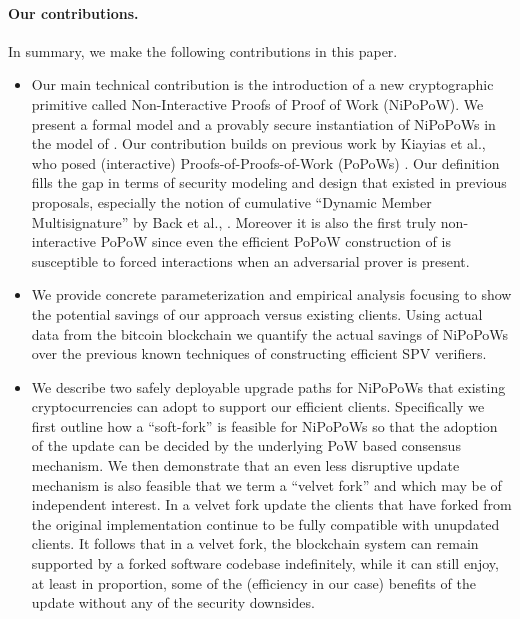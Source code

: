 \paragraph{Our contributions.}
In summary,  we make the following contributions in this paper.
  \begin{itemize}
    \item Our main technical contribution is the introduction of
    a new cryptographic
     primitive called Non-Interactive Proofs of Proof of Work (NiPoPoW). We present a formal model and a provably secure
     instantiation of NiPoPoWs in the model of \cite{backbone}.
     Our contribution builds on previous work by  Kiayias et al., who posed
     (interactive) Proofs-of-Proofs-of-Work (PoPoWs) \cite{KLS}.
     Our definition fills the gap in terms of security modeling and design that
      existed in previous proposals, especially the notion of cumulative
      ``Dynamic Member Multisignature'' by Back et al., \cite{}. Moreover
      it is also the first truly non-interactive PoPoW since even the
      efficient PoPoW construction of \cite{KLS} is susceptible to forced
      interactions when an adversarial prover is present.

  \item We provide concrete parameterization and empirical analysis focusing to show the potential savings of our approach versus existing clients.
Using actual data from the bitcoin blockchain we quantify the actual savings of NiPoPoWs over
the previous known techniques of constructing efficient SPV verifiers.
   \item We describe two safely deployable upgrade paths for NiPoPoWs that existing cryptocurrencies can  adopt to support our efficient clients. Specifically
   we first outline how a ``soft-fork''  is feasible for NiPoPoWs so that the
   adoption of the update can be decided by the underlying PoW based consensus mechanism. We then demonstrate that an even less disruptive update mechanism is also feasible that we term a ``velvet fork'' and which may be of independent interest. In a velvet fork update the clients that have forked from the original implementation continue to be fully compatible with unupdated clients. It follows that in a velvet fork, the blockchain system can remain supported by a forked software codebase indefinitely, while it can still enjoy, at least in proportion, some of the (efficiency in our case) benefits of the update without any of the  security downsides.
  \end{itemize}

